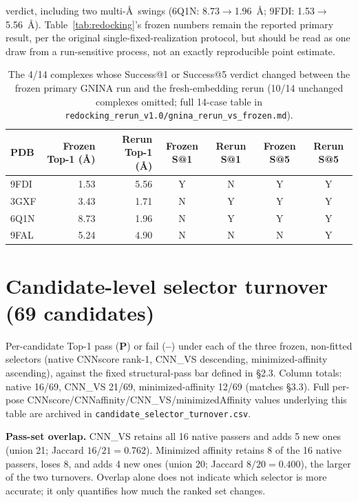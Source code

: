 \documentclass{article}
\begin{document}
verdict, including two multi-\AA\ swings (6Q1N: 8.73$\to$1.96~\AA; 9FDI: 1.53$\to$5.56~\AA). Table~\ref{tab:redocking}'s frozen numbers remain the reported primary result, per the original single-fixed-realization protocol, but should be read as one draw from a run-sensitive process, not an exactly reproducible point estimate.

\begin{table}[h]
\centering
\footnotesize
\begin{tabular}{lrrcccc}
\toprule
PDB & Frozen Top-1 (\AA) & Rerun Top-1 (\AA) & Frozen S@1 & Rerun S@1 & Frozen S@5 & Rerun S@5 \\
\midrule
9FDI & 1.53 & 5.56 & Y & N & Y & Y \\
3GXF & 3.43 & 1.71 & N & Y & Y & Y \\
6Q1N & 8.73 & 1.96 & N & Y & Y & Y \\
9FAL & 5.24 & 4.90 & N & N & N & Y \\
\bottomrule
\end{tabular}
\caption{The 4/14 complexes whose Success@1 or Success@5 verdict changed between the frozen primary GNINA run and the fresh-embedding rerun (10/14 unchanged complexes omitted; full 14-case table in \texttt{redocking\_rerun\_v1.0/gnina\_rerun\_vs\_frozen.md}).}
\label{tab:redocking-rerun}
\end{table}

\FloatBarrier
\section{Candidate-level selector turnover (69 candidates)}
\label{app:e}

Per-candidate Top-1 pass (\textbf{P}) or fail (\textbf{--}) under each of the three frozen, non-fitted selectors (native CNNscore rank-1, CNN\_VS descending, minimized-affinity ascending), against the fixed structural-pass bar defined in \S2.3. Column totals: native 16/69, CNN\_VS 21/69, minimized-affinity 12/69 (matches \S3.3). Full per-pose CNNscore/CNNaffinity/CNN\_VS/minimizedAffinity values underlying this table are archived in \texttt{candidate\_selector\_turnover.csv}.

\textbf{Pass-set overlap.} CNN\_VS retains all 16 native passers and adds 5 new ones (union 21; Jaccard $16/21=0.762$). Minimized affinity retains 8 of the 16 native passers, loses 8, and adds 4 new ones (union 20; Jaccard $8/20=0.400$), the larger of the two turnovers. Overlap alone does not indicate which selector is more accurate; it only quantifies how much the ranked set changes.
\end{document}
